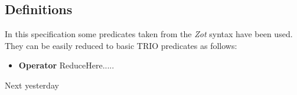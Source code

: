 \subsection{Definitions}

In this specification some predicates taken from the \textit{Zot} syntax have been used. They can be easily reduced to basic TRIO predicates as follows:
\begin {itemize}
\item \textbf{Operator} ReduceHere.....

\end {itemize}
Next
yesterday
